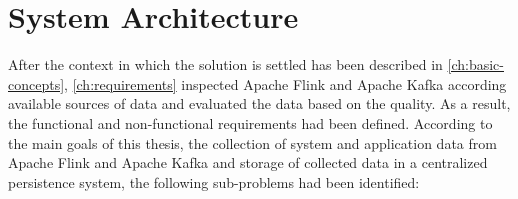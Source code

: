 \chapter{System Architecture}
\label{ch:architecture}


After the context in which the solution is settled has been described in \autoref{ch:basic-concepts}, \autoref{ch:requirements}
inspected Apache Flink and Apache Kafka according available sources of data and evaluated the data based on the quality. As
a result, the functional and non-functional requirements had been defined. According to the main goals of this thesis,
the collection of system and application data from Apache Flink and Apache Kafka and storage of collected data in a
centralized persistence system, the following sub-problems had been identified:

